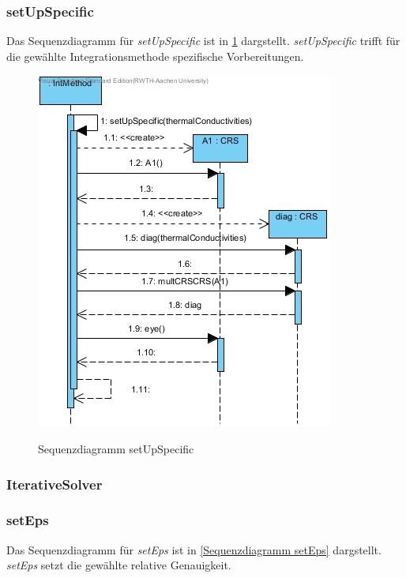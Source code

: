 \subsubsection*{setUpSpecific}

Das Sequenzdiagramm für \emph{setUpSpecific} ist in \ref{Sequenzdiagramm setUpSpecific} dargstellt. \emph{setUpSpecific} trifft für die gewählte Integrationsmethode spezifische Vorbereitungen.

\begin{figure}[H]
	\centering
	\includegraphics[scale=.6]{Bilder/IntMethod__setUpSpecific().jpg}\\
	\caption{Sequenzdiagramm setUpSpecific}
	\label{Sequenzdiagramm setUpSpecific}
\end{figure}

\subsubsection{IterativeSolver}

\subsubsection*{setEps}

Das Sequenzdiagramm für \emph{setEps} ist in \ref{Sequenzdiagramm setEps} dargstellt. \emph{setEps} setzt die gewählte relative Genauigkeit.

